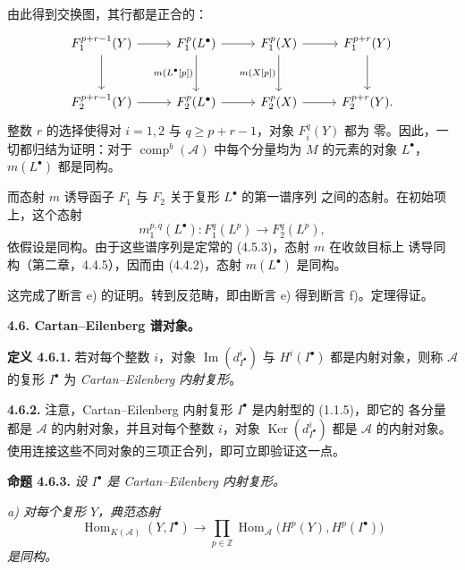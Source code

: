 \clearpage
{}%
\begingroup\small\setlength{\parskip}{0pt}\setlength{\emergencystretch}{1.5em}
\setlength{\abovedisplayskip}{4pt plus 2pt minus 2pt}%
\setlength{\belowdisplayskip}{4pt plus 2pt minus 2pt}%

由此得到交换图，其行都是正合的：
\[
\begin{tikzcd}[column sep=2.7em,row sep=2.8em]
F_1^{p+r-1}(Y) \arrow[r] \arrow[d] &
F_1^p(L^\bullet) \arrow[r] \arrow[d,"{m(L^\bullet[p])}"'] &
F_1^p(X) \arrow[r] \arrow[d,"{m(X[p])}"'] &
F_1^{p+r}(Y) \arrow[d] \\
F_2^{p+r-1}(Y) \arrow[r] &
F_2^p(L^\bullet) \arrow[r] &
F_2^p(X) \arrow[r] &
F_2^{p+r}(Y).
\end{tikzcd}
\]
整数 $r$ 的选择使得对 $i=1,2$ 与 $q\geq p+r-1$，对象 $F_i^q(Y)$ 都为
零。因此，一切都归结为证明：对于 $\operatorname{comp}^{b}(\mathcal A)$
中每个分量均为 $M$ 的元素的对象 $L^\bullet$，$m(L^\bullet)$ 都是同构。

而态射 $m$ 诱导函子 $F_1$ 与 $F_2$ 关于复形 $L^\bullet$ 的第一谱序列
之间的态射。在初始项上，这个态射
\[
m_1^{p,q}(L^\bullet)\colon F_1^q(L^p)\longrightarrow F_2^q(L^p),
\]
依假设是同构。由于这些谱序列是定常的 (4.5.3)，态射 $m$ 在收敛目标上
诱导同构（第二章，4.4.5），因而由 (4.4.2)，态射 $m(L^\bullet)$ 是同构。

这完成了断言 e) 的证明。转到反范畴，即由断言 e) 得到断言 f)。定理得证。

\medskip\noindent\textbf{4.6. Cartan--Eilenberg 谱对象。}

\noindent\textbf{定义 4.6.1.}\quad
若对每个整数 $i$，对象 $\operatorname{Im}(d_{I^\bullet}^{i})$ 与
$H^i(I^\bullet)$ 都是内射对象，则称 $\mathcal A$ 的复形 $I^\bullet$ 为
\emph{Cartan--Eilenberg 内射复形}。

\noindent\textbf{4.6.2.}\quad
注意，Cartan--Eilenberg 内射复形 $I^\bullet$ 是内射型的 (1.1.5)，即它的
各分量都是 $\mathcal A$ 的内射对象，并且对每个整数 $i$，对象
$\operatorname{Ker}(d_{I^\bullet}^{i})$ 都是 $\mathcal A$ 的内射对象。
使用连接这些不同对象的三项正合列，即可立即验证这一点。

\medskip\noindent\textbf{命题 4.6.3.}\quad
\textit{设 $I^\bullet$ 是 Cartan--Eilenberg 内射复形。}

\noindent\textit{a) 对每个复形 $Y$，典范态射}
\[
\operatorname{Hom}_{K(\mathcal A)}(Y,I^\bullet)
\longrightarrow
\prod_{p\in\mathbb Z}
\operatorname{Hom}_{\mathcal A}\bigl(H^p(Y),H^p(I^\bullet)\bigr)
\]
\textit{是同构。}
\endgroup

